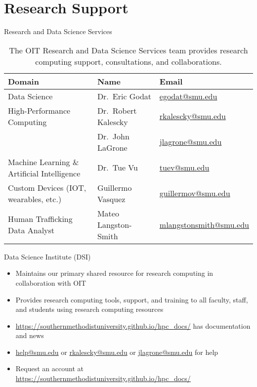 \section{Research Support}

\begin{frame}{Research and Data Science Services}
\begin{table}
\scriptsize
\begin{tabularx}{\textwidth}{Xll}
\toprule
Domain & Name & Email \\
\midrule
Data Science & Dr.\ Eric Godat & \href{mailto:egodat@smu.edu}{egodat@smu.edu} \\
High-Performance Computing & Dr.\ Robert Kalescky & \href{mailto:rkalescky@smu.edu}{rkalescky@smu.edu} \\
& Dr.\ John LaGrone & \href{mailto:jlagrone@smu.edu}{jlagrone@smu.edu} \\
Machine Learning \& Artificial Intelligence & Dr.\ Tue Vu & \href{mailto:tuev@smu.edu}{tuev@smu.edu} \\
Custom Devices (IOT, wearables, etc.) & Guillermo Vasquez & \href{mailto:guillermov@smu.edu}{guillermov@smu.edu} \\
Human Trafficking Data Analyst & Mateo Langston-Smith & \href{mailto:mlangstonsmith@smu.edu}{mlangstonsmith@smu.edu} \\
\bottomrule
\end{tabularx}
\caption{The OIT Research and Data Science Services team provides research computing support, consultations, and collaborations.}
\end{table}
\end{frame}

\begin{frame}{Data Science Institute (DSI)}
\begin{itemize}
  \item Maintains our primary shared resource for research computing in collaboration with OIT
  \item Provides research computing tools, support, and training to all faculty, staff, and students using research computing resources
  \item \url{https://southernmethodistuniversity.github.io/hpc_docs/} has documentation and news
  \item \href{mailto:help@smu.edu}{help@smu.edu} or \href{mailto:rkalescky@smu.edu}{rkalescky@smu.edu} or \href{mailto:jlagrone@smu.edu}{jlagrone@smu.edu} for help
  \item Request an account at \url{https://southernmethodistuniversity.github.io/hpc_docs/}
\end{itemize}
\end{frame}

